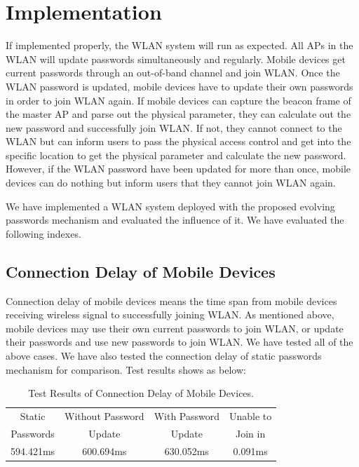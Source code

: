 \section{Implementation}
If implemented properly, the WLAN system will run as expected. All APs in the WLAN will update passwords simultaneously and regularly. Mobile devices get current passwords through an out-of-band channel and join WLAN. Once the WLAN password is updated, mobile devices have to update their own passwords in order to join WLAN again. If mobile devices can capture the beacon frame of the master AP and parse out the physical parameter, they can calculate out the new password and successfully join WLAN. If not, they cannot connect to the WLAN but can inform users to pass the physical access control and get into the specific location to get the physical parameter and calculate the new password. However, if the WLAN password have been updated for more than once, mobile devices can do nothing but inform users that they cannot join WLAN again. 


We have implemented a WLAN system deployed with the proposed evolving passwords mechanism and evaluated the influence of it. We have evaluated the following indexes. 


\subsection{Connection Delay of Mobile Devices}
Connection delay of mobile devices means the time span from mobile devices receiving wireless signal to successfully joining WLAN. As mentioned above, mobile devices may use their own current passwords to join WLAN, or update their passwords and use new passwords to join WLAN. We have tested all of the above cases. We have also tested the connection delay of static passwords mechanism for comparison. Test results shows as below: 

\begin{table}[]
    \centering
    \begin{tabular}{|c|c|c|c|}
        \hline
         {Static } & {Without Password } & {With Password } &{Unable to }
         \\
        
         {Passwords} & {Update} & {Update} &{Join in}\\
         
         \hline
         {594.421ms}& {600.694ms} & {630.052ms} & {0.091ms} 
         \\
         \hline
    \end{tabular}
    \caption{Test Results of Connection Delay of Mobile Devices.}
    \label{tbl:connDelay}
\end{table}

